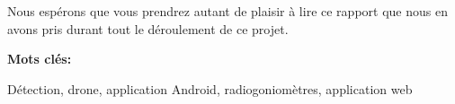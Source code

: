 Nous espérons que vous prendrez autant de plaisir à lire ce rapport que nous en avons pris durant tout le déroulement de ce projet. 


\vfill{}
\textbf{Mots clés:}

Détection, drone, application Android, radiogoniomètres, application web


